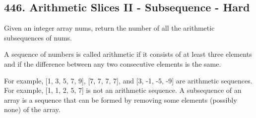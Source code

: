\documentclass[9pt, b5paaper]{book}
\begin{document}
\subsection{446. Arithmetic Slices II - Subsequence - Hard}
\label{sec-1-4-59}
Given an integer array nums, return the number of all the arithmetic subsequences of nums.

A sequence of numbers is called arithmetic if it consists of at least three elements and if the difference between any two consecutive elements is the same.

For example, [1, 3, 5, 7, 9], [7, 7, 7, 7], and [3, -1, -5, -9] are arithmetic sequences.
For example, [1, 1, 2, 5, 7] is not an arithmetic sequence.
A subsequence of an array is a sequence that can be formed by removing some elements (possibly none) of the array.
\end{document}
